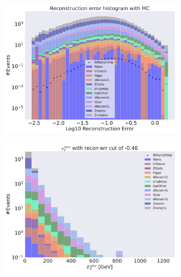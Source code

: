 \begin{figure}[H]
    \centering
    \begin{subfigure}{.40\textwidth}
        \includegraphics[width=\textwidth]{Figures/VAE_testing/small/3lep/b_data_recon_big_rm3_feats_sig_800p0p050p.pdf}
        \caption{ }
        \label{fig:VAE_3lep_small_800_3}
    \end{subfigure}
    \hfill
    \begin{subfigure}{.40\textwidth}
        \includegraphics[width=\textwidth]{Figures/VAE_testing/small/3lep/b_data_recon_big_rm3_feats_sig_800p0p050p_etmiss_recon_errcut_-0.46.pdf}
        \caption{}
        \label{fig:VAE_3lep_small_etmiss_800_3}
    \end{subfigure}

\end{figure}
